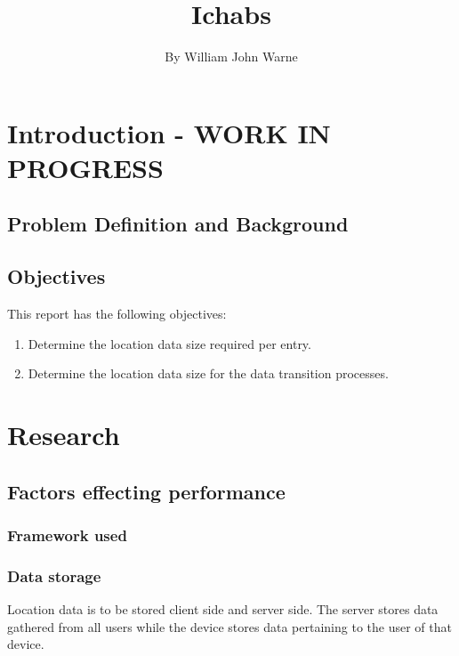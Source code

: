 \documentclass[a4paper,open right,12pt]{report}
\begin{document}
\title{Ichabs} %
\author{By William John Warne}
\maketitle

\renewcommand{\contentsname}{Table of Contents}
\makeatletter
\renewcommand{\cftdotsep}{10000}
\tableofcontents
\newpage


\chapter{Introduction - WORK IN PROGRESS}
\section{Problem Definition and Background}

\section{Objectives}
This report has the following objectives:
\begin{enumerate}
    \item Determine the location data size required per entry.
    \item Determine the location data size for the data transition processes.
\end{enumerate}

\chapter{Research}
\section{Factors effecting performance}

\subsection{Framework used}

\subsection{Data storage}
Location data is to be stored client side and server side. The server stores data gathered from all users while the device stores data pertaining to the user of that device.
\end{document}
